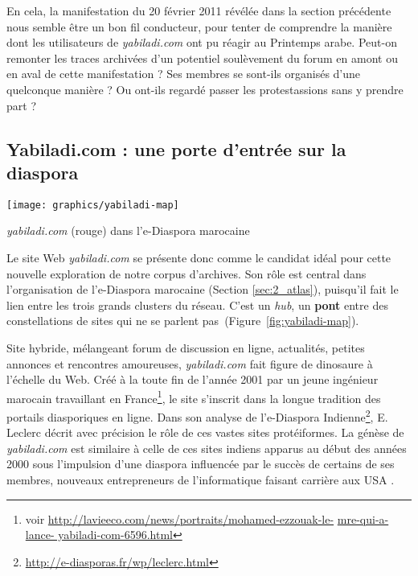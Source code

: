 \documentclass[symmetric,justified,marginals=raggedouter]{tufte-book}
\begin{document}
En cela, la manifestation du 20 février 2011 révélée dans la section précédente nous semble être un bon fil conducteur, pour tenter de comprendre la manière dont les utilisateurs de \textit{yabiladi.com} ont pu réagir au Printemps arabe. Peut-on remonter les traces archivées d'un potentiel soulèvement du forum en amont ou en aval de cette manifestation ? Ses membres se sont-ils organisés d'une quelconque manière ? Ou ont-ils regardé passer les protestassions sans y prendre part ? 

\subsection{Yabiladi.com : une porte d'entrée sur la diaspora}

\begin{marginfigure}%
  \texttt{[image: graphics/yabiladi-map]}
  \vspace*{0.2cm}  
  \caption{\textit{yabiladi.com} (rouge) dans l'e-Diaspora marocaine}
  \label{fig:yabiladi-map}
\end{marginfigure} 

\noindent Le site Web \textit{yabiladi.com} se présente donc comme le candidat idéal pour cette nouvelle exploration de notre corpus d'archives.  Son rôle est central dans l'organisation de l'e-Diaspora marocaine (Section \ref{sec:2_atlas}), puisqu'il fait le lien entre les trois grands clusters du réseau. C'est un \textit{hub}, un \textbf{pont} entre des constellations de sites qui ne se parlent pas~(Figure~\ref{fig:yabiladi-map}).

Site hybride, mélangeant forum de discussion en ligne, actualités, petites annonces et rencontres amoureuses, \textit{yabiladi.com} fait figure de dinosaure à l'échelle du Web. Créé à la toute fin de l'année 2001 par un jeune ingénieur marocain travaillant en France\footnote{\RaggedOuter voir \url{http://lavieeco.com/news/portraits/mohamed-ezzouak-le-} \url{mre-qui-a-lance-
yabiladi-com-6596.html}}, le site s'inscrit dans la longue tradition des portails diasporiques en ligne. Dans son analyse de l'e-Diaspora Indienne\footnote{\RaggedOuter \url{http://e-diasporas.fr/wp/leclerc.html}}, E. Leclerc décrit avec précision le rôle de ces vastes sites protéiformes. La génèse de \textit{yabiladi.com} est similaire à celle de ces sites indiens apparus au début des années 2000 sous l'impulsion d'une diaspora influencée par le succès de certains de ses membres, nouveaux entrepreneurs de l'informatique faisant carrière aux USA \citep{leclerc_cyberespace_2012}.\\
\end{document}
